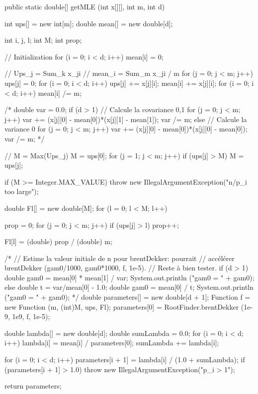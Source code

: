 \begin{code}

   public static double[] getMLE (int x[][], int m, int d)\begin{hide} {
      int ups[] = new int[m];
      double mean[] = new double[d];

      int i, j, l;
      int M;
      int prop;

      // Initialization
      for (i = 0; i < d; i++)
         mean[i] = 0;

      // Ups_j = Sum_k x_ji
      // mean_i = Sum_m x_ji / m
      for (j = 0; j < m; j++) {
         ups[j] = 0;
         for (i = 0; i < d; i++) {
            ups[j] += x[j][i];
            mean[i] += x[j][i];
         }
      }
      for (i = 0; i < d; i++)
         mean[i] /= m;

/*
      double var = 0.0;
      if (d > 1) {
         // Calcule la covariance 0,1
         for (j = 0; j < m; j++)
            var += (x[j][0] - mean[0])*(x[j][1] - mean[1]);
         var /= m;
      } else {
         // Calcule la variance 0
         for (j = 0; j < m; j++)
            var += (x[j][0] - mean[0])*(x[j][0] - mean[0]);
         var /= m;
      }
*/

      // M = Max(Ups_j)
      M = ups[0];
      for (j = 1; j < m; j++)
         if (ups[j] > M)
            M = ups[j];

      if (M >= Integer.MAX_VALUE)
         throw new IllegalArgumentException("n/p_i too large");

      double Fl[] = new double[M];
      for (l = 0; l < M; l++) {
         prop = 0;
         for (j = 0; j < m; j++)
            if (ups[j] > l)
               prop++;

         Fl[l] = (double) prop / (double) m;
      }

/*
      // Estime la valeur initiale de n pour brentDekker: pourrait
      // accélérer brentDekker (gam0/1000, gam0*1000, f, 1e-5).
      // Reste à bien tester.
      if (d > 1) {
         double gam0 = mean[0] * mean[1] / var;
         System.out.println ("gam0 = " + gam0);
      } else {
         double t = var/mean[0] - 1.0;
         double gam0 = mean[0] / t;
         System.out.println ("gam0 = " + gam0);
      }
*/
      double parameters[] = new double[d + 1];
      Function f = new Function (m, (int)M, ups, Fl);
      parameters[0] = RootFinder.brentDekker (1e-9, 1e9, f, 1e-5);

      double lambda[] = new double[d];
      double sumLambda = 0.0;
      for (i = 0; i < d; i++) {
         lambda[i] = mean[i] / parameters[0];
         sumLambda += lambda[i];
      }

      for (i = 0; i < d; i++) {
         parameters[i + 1] = lambda[i] / (1.0 + sumLambda);
         if (parameters[i + 1] > 1.0)
            throw new IllegalArgumentException("p_i > 1");
      }

      return parameters;
   }\end{hide}
\end{code}

